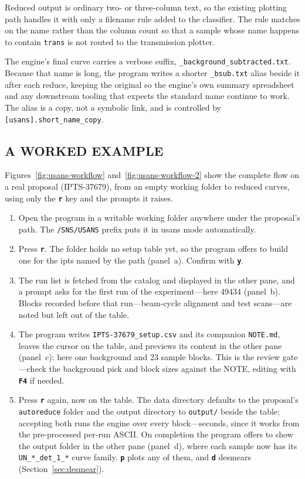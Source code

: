 \documentclass[tm]{ornltm}
\newcommand{\key}[1]{\textbf{\texttt{#1}}}
\begin{document}
Reduced output is ordinary two- or three-column text, so the existing plotting
path handles it with only a filename rule added to the classifier. The rule
matches on the name rather than the column count so that a sample whose name
happens to contain \texttt{trans} is not routed to the transmission plotter.

The engine's final curve carries a verbose suffix,
\texttt{\_background\_subtracted.txt}. Because that name is long, the program
writes a shorter \texttt{\_bsub.txt} alias beside it after each reduce, keeping
the original so the engine's own summary spreadsheet and any downstream tooling
that expects the standard name continue to work. The alias is a copy, not a
symbolic link, and is controlled by \texttt{[usans].short\_name\_copy}.

\subsection{A WORKED EXAMPLE}
\label{sec:usans-example}

Figures~\ref{fig:usans-workflow} and~\ref{fig:usans-workflow-2} show the complete flow on a real proposal
(IPTS-37679), from an empty working folder to reduced curves, using only the
\key{r} key and the prompts it raises.

\begin{enumerate}
  \item Open the program in a writable working folder anywhere under the
    proposal's path. The \texttt{/SNS/USANS} prefix puts it in \ac{usans} mode
    automatically.
  \item Press \key{r}. The folder holds no setup table yet, so the program
    offers to build one for the \ac{ipts} named by the path
    (panel~a). Confirm with \key{y}.
  \item The run list is fetched from the catalog and displayed in the other
    pane, and a prompt asks for the first run of the experiment---here
    49434 (panel~b). Blocks recorded before that run---beam-cycle alignment
    and test scans---are noted but left out of the table.
  \item The program writes \texttt{IPTS-37679\_setup.csv} and its companion
    \texttt{NOTE.md}, leaves the cursor on the table, and previews its content
    in the other pane (panel~c): here one background and 23 sample blocks.
    This is the review gate---check the background pick and block sizes
    against the NOTE, editing with \key{F4} if needed.
  \item Press \key{r} again, now on the table. The data directory defaults to
    the proposal's \texttt{autoreduce} folder and the output directory to
    \texttt{output/} beside the table; accepting both runs the engine over
    every block---seconds, since it works from the pre-processed per-run
    ASCII. On completion the program offers to show the output folder in
    the other pane (panel~d), where each sample now has its
    \texttt{UN\_*\_det\_1\_*} curve family. \key{p} plots any of them, and
    \key{d} desmears (Section~\ref{sec:desmear}).
\end{enumerate}
\end{document}
